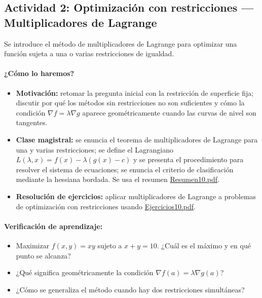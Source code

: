 \documentclass[a4,11pt]{aleph-notas}
\begin{document}
\subsection*{Actividad 2: Optimización con restricciones — Multiplicadores de Lagrange}
Se introduce el método de multiplicadores de Lagrange para optimizar una función sujeta a una o varias restricciones de igualdad.

\paragraph{¿Cómo lo haremos?}
\begin{itemize}[leftmargin=*]
    \item \textbf{Motivación:} retomar la pregunta inicial con la restricción de superficie fija; discutir por qué los métodos sin restricciones no son suficientes y cómo la condición $\nabla f = \lambda \nabla g$ aparece geométricamente cuando las curvas de nivel son tangentes.
    \item \textbf{Clase magistral:} se enuncia el teorema de multiplicadores de Lagrange para una y varias restricciones; se define el Lagrangiano $L(\lambda,x)=f(x)-\lambda(g(x)-c)$ y se presenta el procedimiento para resolver el sistema de ecuaciones; se enuncia el criterio de clasificación mediante la hessiana bordada. Se usa el resumen \href{https://andres-merino.github.io/MatematicaIII-05-N0051/01Resumen/Resumen10.pdf}{Resumen10.pdf}.
    \item \textbf{Resolución de ejercicios:} aplicar multiplicadores de Lagrange a problemas de optimización con restricciones usando \href{https://andres-merino.github.io/MatematicaIII-05-N0051/04Ejercicios/Ejercicios10.pdf}{Ejercicios10.pdf}.
\end{itemize}

\paragraph{Verificación de aprendizaje:}
\begin{itemize}[leftmargin=*]
    \item Maximizar $f(x,y)=xy$ sujeto a $x+y=10$. ¿Cuál es el máximo y en qué punto se alcanza?
    \item ¿Qué significa geométricamente la condición $\nabla f(a)=\lambda \nabla g(a)$?
    \item ¿Cómo se generaliza el método cuando hay dos restricciones simultáneas?
\end{itemize}
\end{document}
